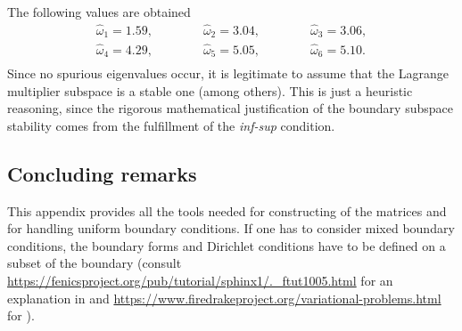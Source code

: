 The following values are obtained 
\begin{align*}
\widehat{\omega}_1 = 1.59, \qquad\qquad \widehat{\omega}_2 = 3.04, \qquad\qquad \widehat{\omega}_3 = 3.06, \\
\widehat{\omega}_4 = 4.29, \qquad\qquad \widehat{\omega}_5 = 5.05, \qquad\qquad \widehat{\omega}_6 = 5.10. \\
\end{align*}
Since no spurious eigenvalues occur, it is legitimate to assume that the Lagrange multiplier subspace is a stable one (among others). This is just a heuristic reasoning, since the rigorous mathematical justification of the boundary subspace stability comes from the fulfillment of the \textit{inf-sup} condition.

\subsection*{Concluding remarks}
This appendix provides all the tools needed for constructing of the matrices and for handling uniform boundary conditions. If one has to consider mixed boundary conditions, the boundary forms and Dirichlet conditions have to be defined on a subset of the boundary (consult \url{https://fenicsproject.org/pub/tutorial/sphinx1/._ftut1005.html} for an explanation in \fenics and \url{https://www.firedrakeproject.org/variational-problems.html} for \firedrake). 